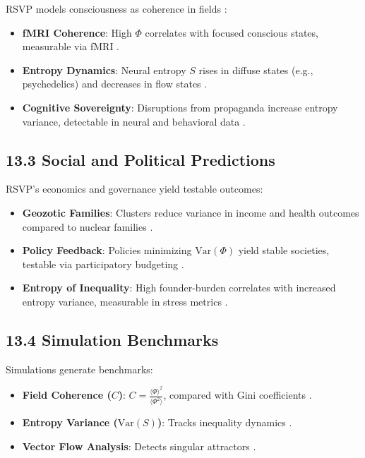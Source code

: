 \documentclass[12pt]{article}
\begin{document}
{{RSVP models consciousness as coherence in fields \citep{tononi2004}:
\begin{itemize}
    \item \textbf{fMRI Coherence}: High \(\Phi\) correlates with focused conscious states, measurable via fMRI \citep{hohwy2013}.
    \item \textbf{Entropy Dynamics}: Neural entropy \(S\) rises in diffuse states (e.g., psychedelics) and decreases in flow states \citep{shannon1948}.
    \item \textbf{Cognitive Sovereignty}: Disruptions from propaganda increase entropy variance, detectable in neural and behavioral data \citep{lanier2018}.
\end{itemize}

\subsection*{13.3 Social and Political Predictions}

RSVP’s economics and governance yield testable outcomes:
\begin{itemize}
    \item \textbf{Geozotic Families}: Clusters reduce variance in income and health outcomes compared to nuclear families \citep{deleuze1987}.
    \item \textbf{Policy Feedback}: Policies minimizing \(\mathrm{Var}(\Phi)\) yield stable societies, testable via participatory budgeting \citep{hanson2003}.
    \item \textbf{Entropy of Inequality}: High founder-burden correlates with increased entropy variance, measurable in stress metrics \citep{zuboff2019}.
\end{itemize}

\subsection*{13.4 Simulation Benchmarks}

Simulations generate benchmarks:
\begin{itemize}
    \item \textbf{Field Coherence (\(C\))}: \(C = \frac{\langle \Phi \rangle^2}{\langle \Phi^2 \rangle}\), compared with Gini coefficients \citep{gromov1999}.
    \item \textbf{Entropy Variance (\(\mathrm{Var}(S)\))}: Tracks inequality dynamics \citep{shannon1948}.
    \item \textbf{Vector Flow Analysis}: Detects singular attractors \citep{pearl2009}.
\end{itemize}

}}
\end{document}

